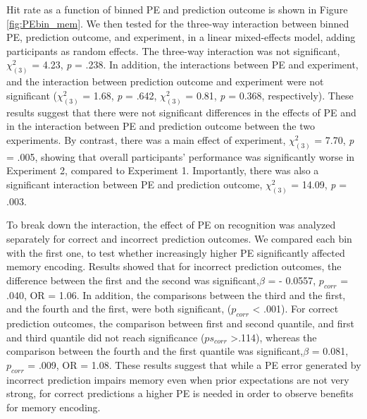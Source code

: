 \documentclass[a4paper,12pt]{article} 			%
\begin{document}
Hit rate as a function of binned PE and prediction outcome is shown in Figure \ref{fig:PEbin_mem}. 
 We then tested for the three-way interaction between binned PE, prediction outcome, and experiment, in a linear mixed-effects model, adding participants as random effects. The three-way interaction was not significant, $\chi^2_{(3)}$ = 4.23, \textit{p} = .238. In addition, the interactions between PE and experiment, and the interaction between prediction outcome and experiment were not significant ($\chi^2_{(3)}$ = 1.68, \textit{p} = .642, $\chi^2_{(3)}$ = 0.81, \textit{p} = 0.368, respectively). These results suggest that there were not significant differences in the effects of PE and in the interaction between PE and prediction outcome between the two experiments. By contrast, there was a main effect of experiment, $\chi^2_{(3)}$ = 7.70,  \textit{p} = .005,  showing that overall participants’ performance was significantly worse in Experiment 2, compared to Experiment 1. Importantly, there was also a significant interaction between PE and prediction outcome, $\chi^2_{(3)}$ = 14.09, \textit{p} = .003.\par
 To break down the interaction, the effect of PE on recognition was analyzed separately for correct and incorrect prediction outcomes. We compared each bin with the first one, to test whether increasingly higher PE significantly affected memory encoding. Results showed that for incorrect prediction outcomes, the difference between the first and the second was significant,$\beta$ = - 0.0557, $p_{corr}$ = .040, OR = 1.06. In addition, the comparisons between the third and the first, and the fourth and the first, were both significant, ($p_{corr}$ < .001). For correct prediction outcomes, the comparison between first and second quantile, and first and third quantile did not reach significance ($ps_{corr}$  >.114), whereas the comparison between the fourth and the first quantile was significant,$\beta$ = 0.081, $p_{corr}$ = .009, OR = 1.08. These results suggest that while a PE error generated by incorrect prediction impairs memory even when prior expectations are not very strong, for correct predictions a higher PE is needed in order to observe benefits for memory encoding. 
\end{document}
